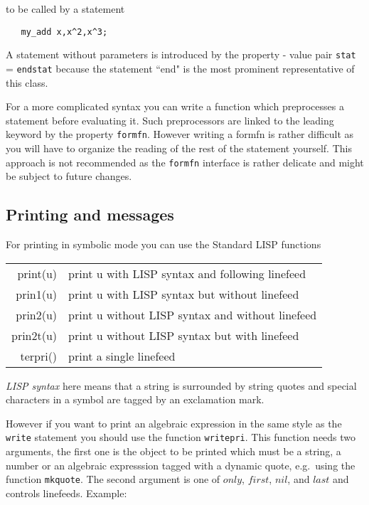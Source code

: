 to be called by a statement 
\begin{verbatim}
   my_add x,x^2,x^3;
\end{verbatim}

A statement without parameters is introduced by the
property - value pair 
{\tt stat} = {\tt endstat}
because the statement ``end" is the most prominent
representative of this class. 

For a more complicated syntax you can write a function
which preprocesses a statement before evaluating
it. Such preprocessors are linked to the leading
keyword by the property {\tt formfn}. However
writing a formfn is rather difficult as you will
have to organize the reading of the rest of the
statement yourself. This approach is not recommended
as the {\tt formfn} interface is rather delicate
and might be subject to future changes.

\subsection{Printing and messages}

For printing in symbolic mode you can use the Standard LISP
functions 

\begin{center}
\begin{tabular}{|r|l|}\hline
   print(u) & print u with LISP syntax and following linefeed\\
   prin1(u) & print u with LISP syntax but without linefeed\\
   prin2(u) & print u without LISP syntax and without linefeed\\
   prin2t(u)& print u without LISP syntax but with linefeed\\
   terpri() & print a single linefeed\\ \hline
\end{tabular} 
\end{center}

{\em LISP syntax} here means that a string is surrounded by
string quotes and special characters in a symbol are
tagged by an exclamation mark.

However if you want to print an algebraic expression
in the same style as the {\reduce} {\tt write}
statement you should use the function {\tt writepri}.
This function needs two arguments, the first one
is the object to be printed which must be a string,
a number or an algebraic expresssion tagged with
a dynamic quote, e.g.\  using the function {\tt mkquote}. 
The second argument is one of $only$,
$first$, $nil$, and $last$ and controls linefeeds.
Example:

